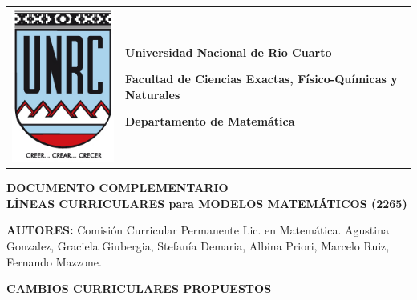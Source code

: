 \documentclass[12pt]{article}
\begin{document}
\pagestyle{plain}


\setlength{\unitlength}{1cm}
%
%

\noindent\begin{tabular}{m{} m{}}
\includegraphics[scale=.25]{escudounrc.jpg} &
\begin{large}
\textbf{Universidad Nacional de Rio Cuarto}\par
\textbf{Facultad de Ciencias Exactas, Físico-Químicas y Naturales}\par
\textbf{Departamento de Matemática
}
\end{large}
\\
\end{tabular}

\setlength{\parindent}{0pt} %

\begin{center}
 \textbf{DOCUMENTO COMPLEMENTARIO\\
LÍNEAS CURRICULARES para MODELOS MATEMÁTICOS (2265)\\}
\end{center}



\textbf{AUTORES:} Comisión Curricular Permanente Lic. en Matemática. Agustina Gonzalez, Graciela Giubergia, Stefanía Demaria, Albina Priori,  Marcelo Ruiz, Fernando Mazzone.




 \begin{center}
\textbf{CAMBIOS CURRICULARES PROPUESTOS}

\end{center}
\end{document}
